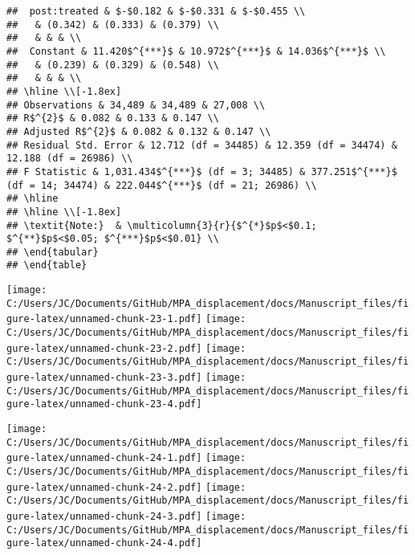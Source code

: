 \documentclass[11pt,]{article}
\begin{document}
\begin{verbatim}
##  post:treated & $-$0.182 & $-$0.331 & $-$0.455 \\ 
##   & (0.342) & (0.333) & (0.379) \\ 
##   & & & \\ 
##  Constant & 11.420$^{***}$ & 10.972$^{***}$ & 14.036$^{***}$ \\ 
##   & (0.239) & (0.329) & (0.548) \\ 
##   & & & \\ 
## \hline \\[-1.8ex] 
## Observations & 34,489 & 34,489 & 27,008 \\ 
## R$^{2}$ & 0.082 & 0.133 & 0.147 \\ 
## Adjusted R$^{2}$ & 0.082 & 0.132 & 0.147 \\ 
## Residual Std. Error & 12.712 (df = 34485) & 12.359 (df = 34474) & 12.188 (df = 26986) \\ 
## F Statistic & 1,031.434$^{***}$ (df = 3; 34485) & 377.251$^{***}$ (df = 14; 34474) & 222.044$^{***}$ (df = 21; 26986) \\ 
## \hline 
## \hline \\[-1.8ex] 
## \textit{Note:}  & \multicolumn{3}{r}{$^{*}$p$<$0.1; $^{**}$p$<$0.05; $^{***}$p$<$0.01} \\ 
## \end{tabular} 
## \end{table}
\end{verbatim}

\texttt{[image: C:/Users/JC/Documents/GitHub/MPA\_displacement/docs/Manuscript\_files/figure-latex/unnamed-chunk-23-1.pdf]}
\texttt{[image: C:/Users/JC/Documents/GitHub/MPA\_displacement/docs/Manuscript\_files/figure-latex/unnamed-chunk-23-2.pdf]}
\texttt{[image: C:/Users/JC/Documents/GitHub/MPA\_displacement/docs/Manuscript\_files/figure-latex/unnamed-chunk-23-3.pdf]}
\texttt{[image: C:/Users/JC/Documents/GitHub/MPA\_displacement/docs/Manuscript\_files/figure-latex/unnamed-chunk-23-4.pdf]}

\texttt{[image: C:/Users/JC/Documents/GitHub/MPA\_displacement/docs/Manuscript\_files/figure-latex/unnamed-chunk-24-1.pdf]}
\texttt{[image: C:/Users/JC/Documents/GitHub/MPA\_displacement/docs/Manuscript\_files/figure-latex/unnamed-chunk-24-2.pdf]}
\texttt{[image: C:/Users/JC/Documents/GitHub/MPA\_displacement/docs/Manuscript\_files/figure-latex/unnamed-chunk-24-3.pdf]}
\texttt{[image: C:/Users/JC/Documents/GitHub/MPA\_displacement/docs/Manuscript\_files/figure-latex/unnamed-chunk-24-4.pdf]}

\clearpage


\end{document}
